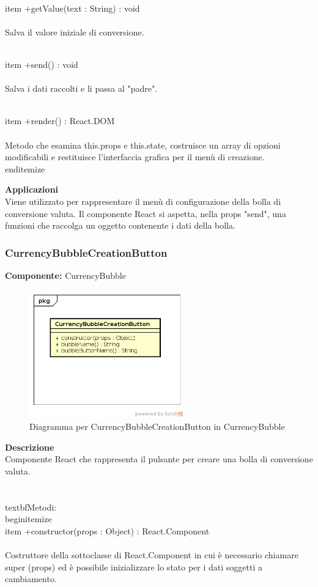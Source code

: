 \\item +getValue(text : String) : void 
\\\\
Salva il valore iniziale di conversione.

\\item +send() : void 
\\\\
Salva i dati raccolti e li passa al "padre".

\\item +render() : React.DOM
\\\\
Metodo che esamina this.props e this.state, costruisce un array di opzioni modificabili e restituisce l'interfaccia grafica per il menù di creazione.
\\end{itemize} 


\textbf{Applicazioni}\\
Viene utilizzato per rappresentare il menù di configurazione della bolla di conversione valuta. Il componente React si aspetta, nella props "send", una funzioni che raccolga un oggetto contenente i dati della bolla. 


\clearpage

\subsubsection{CurrencyBubbleCreationButton}
\textbf{Componente:}  CurrencyBubble\\
   \FloatBarrier
   \begin{figure}[ht]
   \centering
   \includegraphics[width=0.6\textwidth]{img/single-CurrencyBubbleCreationButton}
   \caption{{Diagramma per CurrencyBubbleCreationButton in CurrencyBubble}}
\end{figure}
\FloatBarrier
\textbf{Descrizione}\\
Componente React che rappresenta il pulsante per creare una bolla di conversione valuta.
\\\\
\\textbf{Metodi:} 
\\begin{itemize}
\\item +constructor(props : Object) : React.Component 
\\\\
Costruttore della sottoclasse di React.Component in cui è necessario chiamare super (props) ed è possibile inizializzare lo stato per i dati soggetti a cambiamento.

